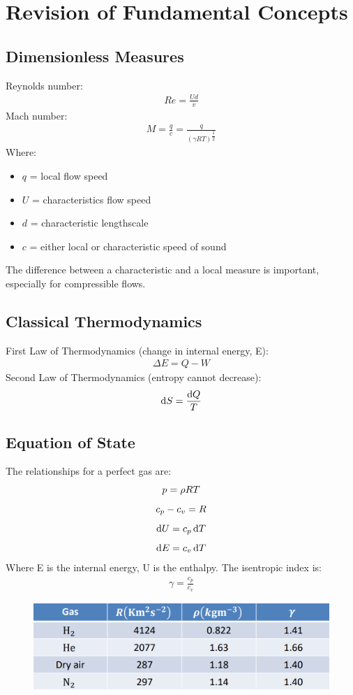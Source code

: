 \documentclass[class=report, crop=false, 12pt,a4paper]{standalone}
\begin{document}
\section{Revision of Fundamental Concepts}
\subsection{Dimensionless Measures}
Reynolds number: 
\begin{gather}
    Re = \frac{Ud}{v}
\end{gather}
Mach number: 
\begin{gather}
    M = \frac{q}{c} = \frac{q}{(\gamma R T)^{\dfrac{1}{2}}}
\end{gather}
Where: 
\begin{itemize}[noitemsep]
    \item $q$ = local flow speed
    \item $U$ = characteristics flow speed
    \item $d$ = characteristic lengthscale
    \item $c$ = either local or characteristic speed of sound
\end{itemize}
The difference between a characteristic and a local measure is important, especially for compressible flows. 
\subsection{Classical Thermodynamics}
First Law of Thermodynamics (change in internal energy, E):
\begin{gather}
    \Delta E = Q - W
\end{gather}
Second Law of Thermodynamics (entropy cannot decrease): 
\begin{gather}
    \dif S = \frac{\dif Q}{T}
\end{gather}
\subsection{Equation of State}
The relationships for a perfect gas are: 
\begin{gather}
    p = \rho R T \\[5pt]
    c_p - c_v = R \\[5pt]
    \dif U = c_p \dif T \\[5pt]
    \dif E = c_v \dif T
\end{gather}
Where E is the internal energy, U is the enthalpy. The isentropic index is: 
\begin{gather}
    \gamma = \frac{c_p}{c_v}
\end{gather}
\begin{figure}[H]
    \centering
    \includegraphics[width = 0.7 \textwidth]{../img/diagram1.PNG} 
    \caption{}
\end{figure}
\end{document}
